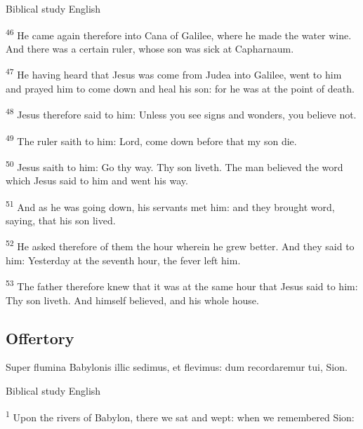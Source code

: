 \begin{englishwitness}{Biblical study English}

\textsuperscript{46} He came again therefore into Cana of Galilee, where he made the water wine. And there was a certain ruler, whose son was sick at Capharnaum.

\textsuperscript{47} He having heard that Jesus was come from Judea into Galilee, went to him and prayed him to come down and heal his son: for he was at the point of death.

\textsuperscript{48} Jesus therefore said to him: Unless you see signs and wonders, you believe not.

\textsuperscript{49} The ruler saith to him: Lord, come down before that my son die.

\textsuperscript{50} Jesus saith to him: Go thy way. Thy son liveth. The man believed the word which Jesus said to him and went his way.

\textsuperscript{51} And as he was going down, his servants met him: and they brought word, saying, that his son lived.

\textsuperscript{52} He asked therefore of them the hour wherein he grew better. And they said to him: Yesterday at the seventh hour, the fever left him.

\textsuperscript{53} The father therefore knew that it was at the same hour that Jesus said to him: Thy son liveth. And himself believed, and his whole house.

\end{englishwitness}


\subsection{Offertory}\label{proper-offertory}


\begin{latinproper}
Super flumina Babylonis illic sedimus, et flevimus: dum recordaremur tui, Sion.
\end{latinproper}

\begin{englishwitness}{Biblical study English}

\textsuperscript{1} Upon the rivers of Babylon, there we sat and wept: when we remembered Sion:

\end{englishwitness}

